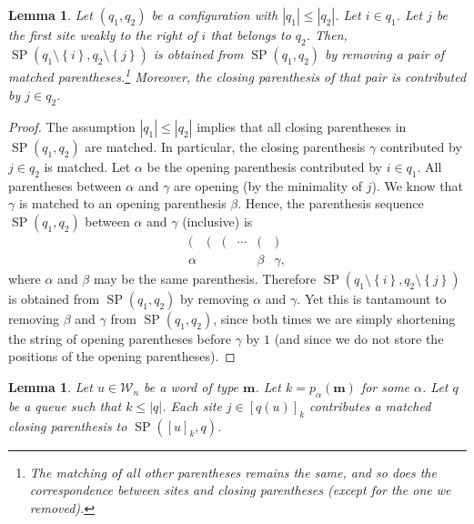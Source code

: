 \documentclass[reqno]{amsart}
\newcommand{\0}{\phantom{c}}
\newcommand{\mm}{\mathbf{m}}
\newcommand{\mcW}{\mathcal{W}}
\newcommand{\SP}{\operatorname{SP}}
\newcommand{\set}[1]{\left\{ #1 \right\}}
\newcommand{\abs}[1]{\left| #1 \right|}
\newcommand{\tup}[1]{\left( #1 \right)}
\newcommand{\ive}[1]{\left[ #1 \right]}
\theoremstyle{plain}
\newtheorem{lemma}[thm]{Lemma}
\theoremstyle{definition}
\numberwithin{equation}{section}
\begin{document}
\begin{lemma} \label{lem:SL.dual.1}
Let $\tup{q_1, q_2}$ be a configuration with $\abs{q_1} \leq \abs{q_2}$.
Let $i \in q_1$.
Let $j$ be the first site weakly to the right of $i$ that belongs to $q_2$.
Then, $\SP(q_1 \setminus \set{i}, q_2 \setminus \set{j})$ is obtained from $\SP(q_1, q_2)$ by removing a pair of matched parentheses.\footnote{The matching of all other parentheses remains the same, and so does the correspondence between sites and closing parentheses (except for the one we removed).}
Moreover, the closing parenthesis of that pair is contributed by $j \in q_2$.
\end{lemma}

\begin{proof}
The assumption $\abs{q_1} \leq \abs{q_2}$ implies that all closing parentheses in $\SP(q_1, q_2)$ are matched.
In particular, the closing parenthesis $\gamma$ contributed by $j \in q_2$ is matched.
Let $\alpha$ be the opening parenthesis contributed by $i \in q_1$.
All parentheses between $\alpha$ and $\gamma$ are opening (by the minimality of $j$).
We know that $\gamma$ is matched to an opening parenthesis $\beta$.
Hence, the parenthesis sequence $\SP(q_1, q_2)$ between $\alpha$ and $\gamma$ (inclusive) is
\[
\begin{array}{cccccc}
( & ( & ( & \cdots & ( & ) \\
\alpha & & & & \beta & \gamma,
\end{array}
\]
where $\alpha$ and $\beta$ may be the same parenthesis.
Therefore $\SP(q_1 \setminus \set{i}, q_2 \setminus \set{j})$ is obtained from $\SP(q_1, q_2)$ by removing $\alpha$ and $\gamma$.
Yet this is tantamount to removing $\beta$ and $\gamma$ from $\SP \tup{q_1, q_2}$, since both times we are simply shortening the string of opening parentheses before $\gamma$ by $1$ (and since we do not store the positions of the opening parentheses).
\end{proof}

\begin{lemma} \label{lem:SL.dual.3}
Let $u \in \mcW_n$ be a word of type $\mm$.
Let $k = p_{\alpha}(\mm)$ for some $\alpha$.
Let $q$ be a queue such that $k \leq \abs{q}$.
Each site $j \in \ive{q(u)}_k$ contributes a matched closing parenthesis to $\SP(\ive{u}_k, q)$.
\end{lemma}
\end{document}
